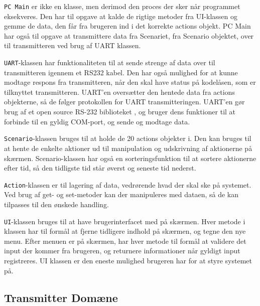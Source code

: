 \texttt{PC Main} er ikke en klasse, men derimod den proces der sker når programmet eksekveres. Den har til opgave at kalde de rigtige metoder fra UI-klassen og gemme de data, den får fra brugeren ind i det korrekte actions objekt.
PC Main har også til opgave at transmittere data fra Scenariet, fra Scenario objektet, over til transmitteren ved brug af UART klassen.

\texttt{UART}-klassen har funktionaliteten til at sende strenge af data over til transmitteren igennem et RS232 kabel. Den har også mulighed for at kunne modtage respons fra transmitteren, når den skal have status på kodelåsen, som er tilknyttet transmitteren. UART'en oversætter den hentede data fra actions objekterne, så de følger protokollen for UART transmitteringen.
UART'en gør brug af et open source RS-232 biblioteket \cite{lib:UART}, og bruger dens funktioner til at forbinde til en gyldig COM-port, og sende og modtage data.

\texttt{Scenario}-klassen bruges til at holde de 20 actions objekter i. Den kan bruges til at hente de enkelte aktioner ud til manipulation og udskrivning af aktionerne på skærmen.
Scenario-klassen har også en sorteringsfunktion til at sortere aktionerne efter tid, så den tidligste tid står øverst og seneste tid nederst.

\texttt{Action}-klassen er til lagering af data, vedrørende hvad der skal ske på systemet. Ved brug af get- og set-metoder kan der manipuleres med dataen, så de kan tilpasses til den ønskede handling.

\texttt{UI}-klassen bruges til at have brugerinterfacet med på skærmen. Hver metode i klassen har til formål at fjerne tidligere indhold på skærmen, og tegne den nye menu. Efter menuen er på skærmen, har hver metode til formål at validere det input der kommer fra brugeren, og returnere informationer når gyldigt input registreres. UI klassen er den eneste mulighed brugeren har for at styre systemet på.

  
\subsection{Transmitter Domæne}

